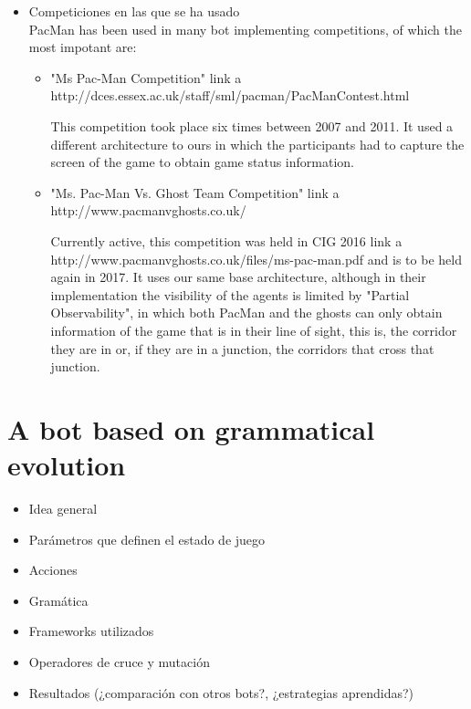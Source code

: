 \documentclass{llncs}
\begin{document}
\begin{itemize}
\item Competiciones en las que se ha usado
\\

PacMan has been used in many bot implementing competitions, of which the most impotant are:

\begin{itemize}
\setlength{\itemindent}{-.3cm}
\item "Ms Pac-Man Competition"{\color{red} link a http://dces.essex.ac.uk/staff/sml/pacman/PacManContest.html}

This competition took place six times between 2007 and 2011. It used a different architecture to ours in which the participants had to capture the screen of the game to obtain game status information. 
\item "Ms. Pac-Man Vs. Ghost Team Competition"{\color{red} link a http://www.pacmanvghosts.co.uk/}

Currently active, this competition was held in CIG 2016{\color{red} link a http://www.pacmanvghosts.co.uk/files/ms-pac-man.pdf} and is to be held again in 2017. It uses our same base architecture, although in their implementation the visibility of the agents is limited by "Partial Observability", in which both PacMan and the ghosts can only obtain information of the game that is in their line of sight, this is, the corridor they are in or, if they are in a junction, the corridors that cross that junction.
\end{itemize}

 


\end{itemize}


%
\section{A bot based on grammatical evolution}
\label{sec:sec1}
%

\begin{itemize}
\item Idea general
\item Parámetros que definen el estado de juego
\item Acciones
\item Gramática
\item Frameworks utilizados
\item Operadores de cruce y mutación
\item Resultados (¿comparación con otros bots?, ¿estrategias aprendidas?)
\end{itemize}
\end{document}
